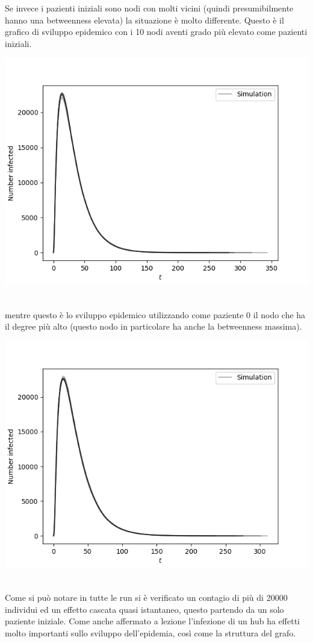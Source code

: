 \documentclass[a4paper]{article}
\begin{document}
\newline \newline
Se invece i pazienti iniziali sono nodi con molti vicini (quindi presumibilmente hanno una betweenness elevata) la situazione è molto differente.
Questo è il grafico di sviluppo epidemico con i 10 nodi aventi grado più elevato come pazienti iniziali.\\
\begin{centering}\includegraphics[width=1\textwidth]{10_best.png}\end{centering}\\
mentre questo è lo sviluppo epidemico utilizzando come paziente 0 il nodo che ha il degree più alto (questo nodo in particolare ha anche la betweenness massima).
\begin{centering}\includegraphics[width=1\textwidth]{1_best.png}\end{centering}\\
Come si può notare in tutte le run si è verificato un contagio di più di 20000 individui ed un effetto cascata quasi istantaneo, questo partendo da un solo paziente iniziale.
Come anche affermato a lezione l'infezione di un hub ha effetti molto importanti sullo sviluppo dell'epidemia, così come la struttura del grafo.
\end{document}
